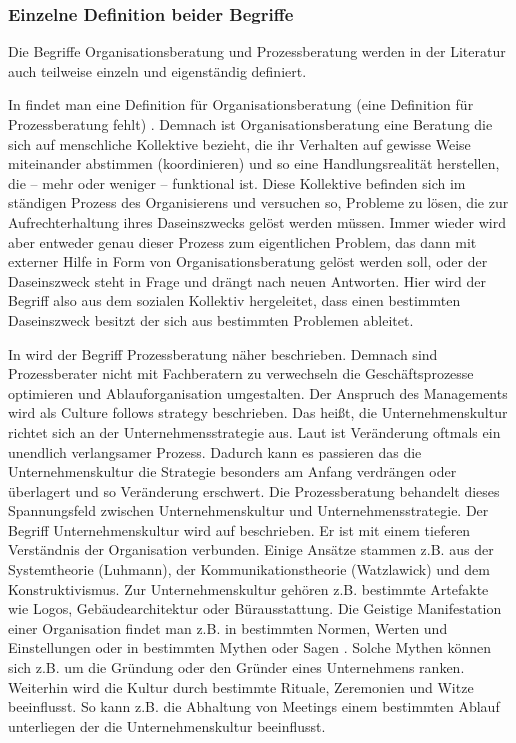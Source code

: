 \subsubsection*{Einzelne Definition beider Begriffe}
Die Begriffe Organisationsberatung und Prozessberatung werden in der Literatur auch teilweise einzeln und eigenständig definiert.

In \cite[28]{MuellerNagel} findet man eine Definition für Organisationsberatung (eine Definition für Prozessberatung fehlt) . Demnach ist Organisationsberatung eine Beratung die \glqq  sich auf menschliche Kollektive bezieht, die ihr Verhalten auf gewisse Weise miteinander abstimmen (koordinieren) und so eine Handlungsrealität herstellen, die – mehr oder weniger – funktional ist. Diese Kollektive befinden sich im ständigen Prozess des Organisierens und versuchen so, Probleme zu lösen, die zur Aufrechterhaltung ihres Daseinszwecks gelöst werden müssen. Immer wieder wird aber entweder genau dieser Prozess zum eigentlichen Problem, das dann mit externer Hilfe in Form von Organisationsberatung gelöst werden soll, oder der Daseinszweck steht in Frage und drängt nach neuen Antworten.
\grqq Hier wird der Begriff also aus dem sozialen Kollektiv hergeleitet, dass einen bestimmten Daseinszweck besitzt der sich aus bestimmten Problemen ableitet.

In \cite[9]{HBProzess} wird der Begriff Prozessberatung näher beschrieben. Demnach sind Prozessberater nicht mit Fachberatern zu verwechseln die Geschäftsprozesse optimieren und Ablauforganisation umgestalten. Der Anspruch des Managements wird als \glqq Culture follows strategy \grqq beschrieben. Das heißt, die Unternehmenskultur richtet sich an der Unternehmensstrategie aus. Laut \cite[9]{HBProzess} ist Veränderung oftmals ein unendlich verlangsamer Prozess. Dadurch kann es passieren das die Unternehmenskultur die Strategie besonders am Anfang verdrängen oder überlagert und so Veränderung erschwert. Die Prozessberatung behandelt dieses Spannungsfeld zwischen Unternehmenskultur und Unternehmensstrategie.
Der Begriff Unternehmenskultur wird auf \cite[ Seite 9]{HBProzess} beschrieben. Er ist mit einem tieferen Verständnis der Organisation verbunden. Einige
Ansätze stammen z.B. aus der Systemtheorie (Luhmann), der Kommunikationstheorie (Watzlawick) und dem Konstruktivismus. Zur Unternehmenskultur gehören z.B. bestimmte Artefakte wie Logos, Gebäudearchitektur oder Bürausstattung. Die Geistige Manifestation einer Organisation findet man z.B. in bestimmten Normen, Werten und Einstellungen oder in bestimmten \glqq Mythen oder Sagen \grqq. Solche Mythen können sich z.B. um die Gründung oder den Gründer eines Unternehmens ranken. Weiterhin wird die Kultur durch bestimmte Rituale, Zeremonien und Witze beeinflusst. So kann z.B. die Abhaltung von Meetings einem bestimmten Ablauf unterliegen der die Unternehmenskultur beeinflusst.

